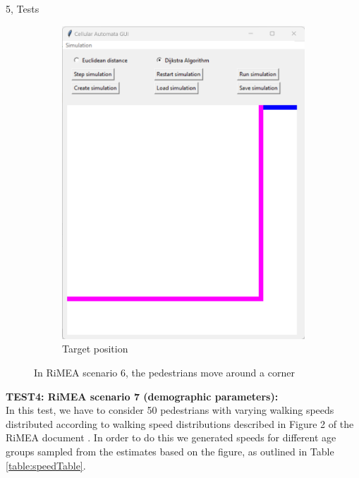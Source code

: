 \documentclass[10pt,a4paper]{article}
\begin{document}
\begin{task}{5, Tests}
\begin{figure}[H]
\begin{subfigure}[b]{0.3\textwidth}
         \includegraphics[width=\textwidth]{images/1-rimea6c.png}
         \caption{Target position}
         \label{fig:rimea6c}
     \end{subfigure}
    \caption{In RiMEA scenario 6, the pedestrians move around a corner}
    \label{fig:rimea6}
\end{figure}

\textbf{TEST4: RiMEA scenario 7 (demographic parameters):}\\
In this test, we have to consider 50 pedestrians with varying walking speeds distributed according to walking speed distributions described in Figure 2 of the RiMEA document \cite{RiMEA}. In order to do this we generated speeds for different age groups sampled from the estimates based on the figure, as outlined in Table \ref{table:speedTable}.



\end{task}
\end{document}
